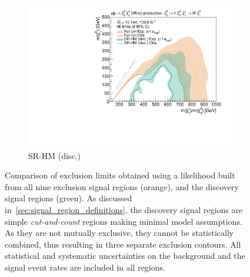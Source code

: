 \begin{figure}
\begin{subfigure}[b]{0.5\textwidth}
		\centering\includegraphics[width=\textwidth]{exclusion_1Lbb_SRHM_noLabel_v2}
		\caption{SR-HM (disc.)\label{fig:single_bin_SRHM}}
	\end{subfigure}%
	\caption{Comparison of exclusion limits obtained using a likelihood built from all nine exclusion signal regions (orange), and the discovery signal regions (green). As discussed in~\cref{sec:signal_region_definitions}, the discovery signal regions are simple \textit{cut-and-count} regions making minimal model assumptions. As they are not mutually exclusive, they cannot be statistically combined, thus resulting in three separate exclusion contours. All statistical and systematic uncertainties on the background and the signal event rates are included in all regions.}\label{fig:single_bin}
\end{figure}

